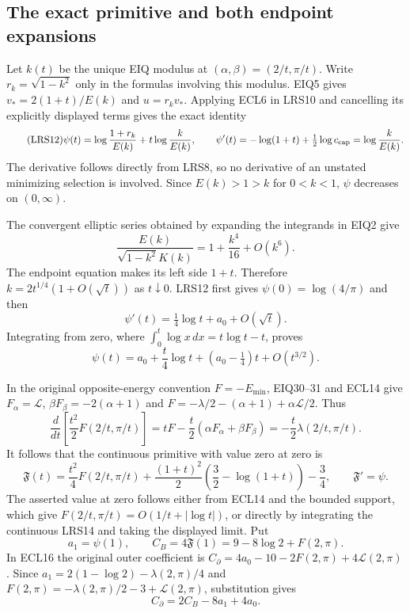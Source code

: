 \documentclass[11pt,a4paper]{article}
\begin{document}
\subsection{The exact primitive and both endpoint expansions}

Let $k(t)$ be the unique EIQ modulus at $(\alpha,\beta)=(2/t,\pi/t)$.
Write $r_k=\sqrt{1-k^2}$ only in the formulas involving this modulus.
EIQ5 gives $v_*=2(1+t)/E(k)$ and $u=r_kv_*$.  Applying ECL6 in
LRS10 and cancelling its explicitly displayed terms gives the exact
identity
\begin{equation}\tag{LRS12}
 \psi(t)=\log\frac{1+r_k}{E(k)}+t\log\frac{k}{E(k)},
 \qquad
 \psi'(t)=-\log(1+t)+\tfrac12\log c_{\rm cap}
             =\log\frac{k}{E(k)}.
\end{equation}
The derivative follows directly from LRS8, so no derivative of an
unstated minimizing selection is involved.  Since $E(k)>1>k$ for
$0<k<1$, $\psi$ decreases on $(0,\infty)$.

The convergent elliptic series obtained by expanding the integrands
in EIQ2 give
\[
 \frac{E(k)}{\sqrt{1-k^2}K(k)}
     =1+\frac{k^4}{16}+O(k^6).
\]
The endpoint equation makes its left side $1+t$.  Therefore
$k=2t^{1/4}(1+O(\sqrt t))$ as $t\downarrow0$.  LRS12 first gives
$\psi(0)=\log(4/\pi)$ and then
\begin{equation}\tag{LRS13}
 \psi'(t)=\tfrac14\log t+a_0+O(\sqrt t).
\end{equation}
Integrating from zero, where $\int_0^t\log x\,dx=t\log t-t$, proves
\begin{equation}\tag{LRS14}
 \psi(t)=a_0+\frac t4\log t+(a_0-\tfrac14)t+O(t^{3/2}).
\end{equation}

In the original opposite-energy convention $F=-E_{\min}$,
EIQ30--31 and ECL14 give
$F_\alpha=\mathcal L$, $\beta F_\beta=-2(\alpha+1)$ and
$F=-\lambda/2-(\alpha+1)+\alpha\mathcal L/2$.
Thus
\[
 \frac d{dt}\left[\frac{t^2}{2}F(2/t,\pi/t)\right]
   =tF-\frac t2(\alpha F_\alpha+\beta F_\beta)
   =-\frac t2\lambda(2/t,\pi/t).
\]
It follows that the continuous primitive with value zero at zero is
\begin{equation}\tag{LRS15}
 \mathfrak F(t)=\frac{t^2}{4}F(2/t,\pi/t)
 +\frac{(1+t)^2}{2}\left(\frac32-\log(1+t)\right)-\frac34,
 \qquad \mathfrak F'=\psi.
\end{equation}
The asserted value at zero follows either from ECL14 and the bounded
support, which give $F(2/t,\pi/t)=O(1/t+|\log t|)$, or directly by
integrating the continuous LRS14 and taking the displayed limit.
Put
\[
 a_1=\psi(1),\qquad C_B=4\mathfrak F(1)=9-8\log2+F(2,\pi).
\]
In ECL16 the original outer coefficient is
$C_\partial=4a_0-10-2F(2,\pi)+4\mathcal L(2,\pi)$.
Since $a_1=2(1-\log2)-\lambda(2,\pi)/4$ and
$F(2,\pi)=-\lambda(2,\pi)/2-3+\mathcal L(2,\pi)$, substitution gives
\begin{equation}\tag{LRS16}
 C_\partial=2C_B-8a_1+4a_0.
\end{equation}
\end{document}
